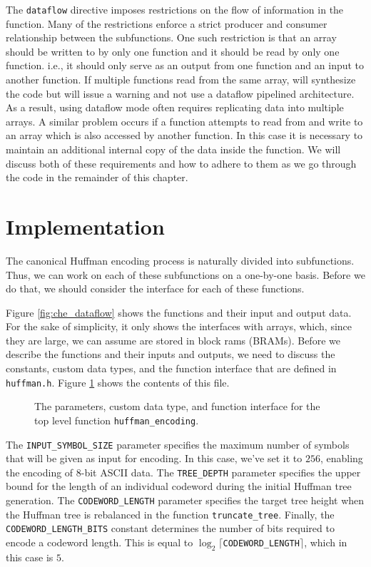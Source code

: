\begin{aside}
The \lstinline{dataflow} directive imposes restrictions on the flow of information in the function. Many of the restrictions enforce a strict producer and consumer relationship between the subfunctions.  One such restriction is that an array should be written to by only one function and it should be read by only one function. i.e., it should only serve as an output from one function and an input to another function. If multiple functions read from the same array, \VHLS will synthesize the code but will issue a warning and not use a dataflow pipelined architecture.  As a result, using dataflow mode often requires replicating data into multiple arrays. A similar problem occurs if a function attempts to read from and write to an array which is also accessed by another function.  In this case it is necessary to maintain an additional internal copy of the data inside the function.  We will discuss both of these requirements and how to adhere to them as we go through the code in the remainder of this chapter.
\end{aside}

\section{Implementation}
The canonical Huffman encoding process is naturally divided into subfunctions. Thus, we can work on each of these subfunctions on a one-by-one basis. Before we do that, we should consider the interface for each of these functions. 

Figure \ref{fig:che_dataflow} shows the functions and their input and output data. For the sake of simplicity, it only shows the interfaces with arrays, which, since they are large, we can assume are stored in block rams (BRAMs). Before we describe the functions and their inputs and outputs, we need to discuss the constants, custom data types, and the function interface that are defined in \lstinline{huffman.h}. Figure \ref{fig:huffman_h} shows the contents of this file. 

\begin{figure}
{\tiny }
\caption{  The parameters, custom data type, and function interface for the top level function \lstinline{huffman_encoding}.  }
\label{fig:huffman_h}
\end{figure}

The \lstinline{INPUT_SYMBOL_SIZE} parameter specifies the maximum number of symbols that will be given as input for encoding.  In this case, we've set it to $256$, enabling the encoding of 8-bit ASCII data. The \lstinline{TREE_DEPTH} parameter specifies the upper bound for the length of an individual codeword during the initial Huffman tree generation. The \lstinline{CODEWORD_LENGTH} parameter specifies the target tree height when the Huffman tree is rebalanced in the function \lstinline{truncate_tree}. Finally, the \lstinline{CODEWORD_LENGTH_BITS} constant determines the number of bits required to encode a codeword length. This is equal to $\log_2 \lceil $\lstinline{CODEWORD_LENGTH}$\rceil$, which in this case is $5$.

